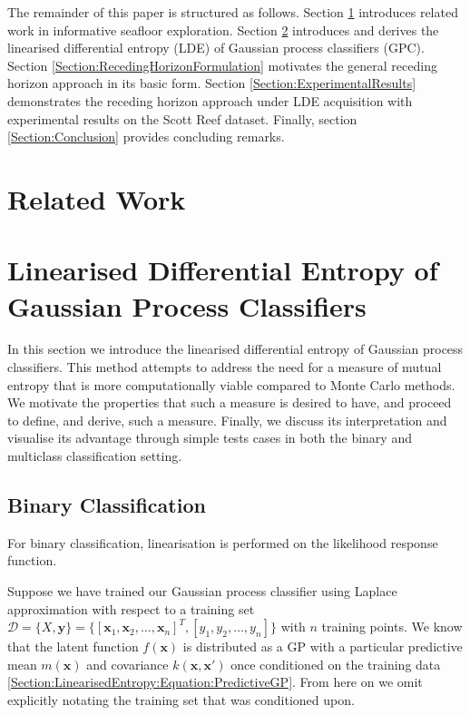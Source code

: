 \documentclass{article}
\renewcommand{\vec}[1]{\boldsymbol{#1}}
\begin{document}
	The remainder of this paper is structured as follows. Section \ref{Section:RelatedWork} introduces related work in informative seafloor exploration. Section \ref{Section:LinearisedEntropy} introduces and derives the linearised differential entropy (LDE) of Gaussian process classifiers (GPC). Section \ref{Section:RecedingHorizonFormulation} motivates the general receding horizon approach in its basic form. Section \ref{Section:ExperimentalResults} demonstrates the receding horizon approach under LDE acquisition with experimental results on the Scott Reef dataset. Finally, section \ref{Section:Conclusion} provides concluding remarks.
	
\section{Related Work}
\label{Section:RelatedWork}

	\cite{AsherBender}

\section{Linearised Differential Entropy of Gaussian Process Classifiers}
\label{Section:LinearisedEntropy}

	In this section we introduce the linearised differential entropy of Gaussian process classifiers. This method attempts to address the need for a measure of mutual entropy that is more computationally viable compared to Monte Carlo methods. We motivate the properties that such a measure is desired to have, and proceed to define, and derive, such a measure. Finally, we discuss its interpretation and visualise its advantage through simple tests cases in both the binary and multiclass classification setting.
	
	\subsection{Binary Classification}

		For binary classification, linearisation is performed on the likelihood response function.
	
		Suppose we have trained our Gaussian process classifier using Laplace approximation with respect to a training set $\mathcal{D} = \{X, \vec{y}\} = \{[ \vec{x}_{1}, \vec{x}_{2}, \dots, \vec{x}_{n}]^{T}, [y_{1}, y_{2}, \dots, y_{n}]\}$ with $n$ training points. We know that the latent function $f(\vec{x})$ is distributed as a GP with a particular predictive mean $m(\vec{x})$ and covariance $k(\vec{x}, \vec{x}')$ once conditioned on the training data \eqref{Section:LinearisedEntropy:Equation:PredictiveGP}. From here on we omit explicitly notating the training set that was conditioned upon.
		
\end{document}
